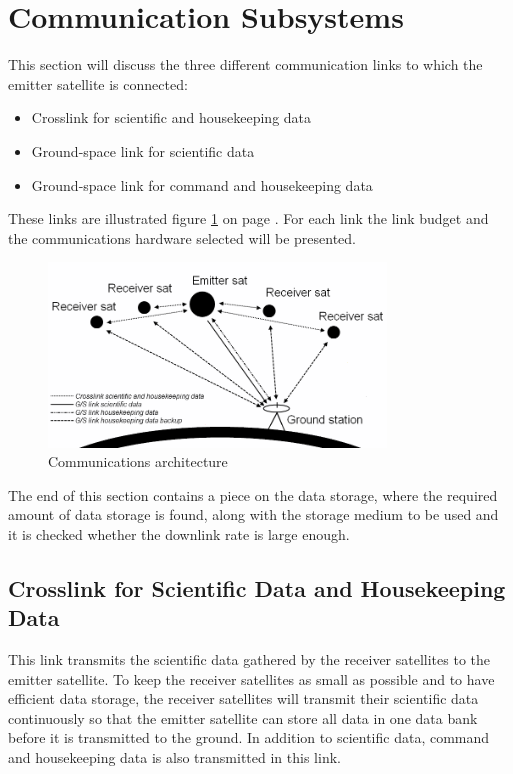 
\section{Communication Subsystems}
This section will discuss the  three different communication links to which the emitter satellite is connected:
\begin{itemize}
\item Crosslink for scientific and housekeeping data
\item Ground-space link for scientific data
\item Ground-space link for command and housekeeping data
\end{itemize}

These links are illustrated figure \ref{fig:allesZW} on page \pageref{fig:allesZW}. For each link the link budget and the communications hardware selected will be presented.

\begin{figure}[ht!]
\centering    \includegraphics[width=0.8\textwidth]{chapters/img/allesZW.png}
\caption{Communications architecture}
\label{fig:allesZW}
\end{figure}

The end of this section contains a piece on the data storage, where the required amount of data storage is found, along with the storage medium to be used and it is checked whether the downlink rate is large enough.


\subsection{Crosslink for Scientific Data and Housekeeping Data}
\label{Crossem}
This link transmits the scientific data gathered by the receiver satellites to the emitter satellite. To keep the receiver satellites as small as possible and to have efficient data storage, the receiver satellites will transmit their scientific data continuously so that the emitter satellite can store all data in one data bank before it is transmitted to the ground. In addition to scientific data, command and housekeeping data is also transmitted in this link.

